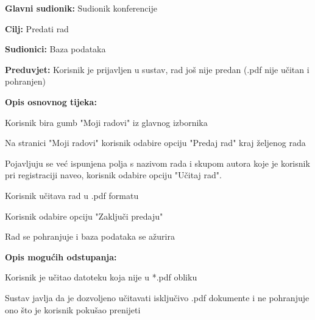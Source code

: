 					\noindent {}
					\begin{packed_item}
	
						\item \textbf{Glavni sudionik: } Sudionik konferencije
						\item  \textbf{Cilj:} Predati rad
						\item  \textbf{Sudionici:} Baza podataka
						\item  \textbf{Preduvjet:} Korisnik je prijavljen u sustav, rad još nije predan (.pdf nije učitan i pohranjen)
						\item  \textbf{Opis osnovnog tijeka:}
						
						\item[] \begin{packed_enum}

							\item Korisnik bira gumb "Moji radovi" iz glavnog izbornika	
							\item Na stranici "Moji radovi" korisnik odabire opciju "Predaj rad" kraj željenog rada
							\item Pojavljuju se već ispunjena polja s nazivom rada i skupom autora koje je korisnik pri registraciji naveo, korisnik odabire opciju "Učitaj rad".
							\item Korisnik učitava rad u .pdf formatu
							\item Korisnik odabire opciju "Zaključi predaju"
							\item Rad se pohranjuje i baza podataka se ažurira

					
						\end{packed_enum}

						\item  \textbf{Opis mogućih odstupanja:}
						
						\item[] \begin{packed_item}
	
							\item[3.a]  Korisnik je učitao datoteku koja nije u *.pdf obliku
							\item[] \begin{packed_enum}
								
								\item Sustav javlja da je dozvoljeno učitavati isključivo .pdf dokumente i ne pohranjuje ono što je korisnik pokušao prenijeti
								
							\end{packed_enum}


\end{packed_item}
\end{packed_item}

